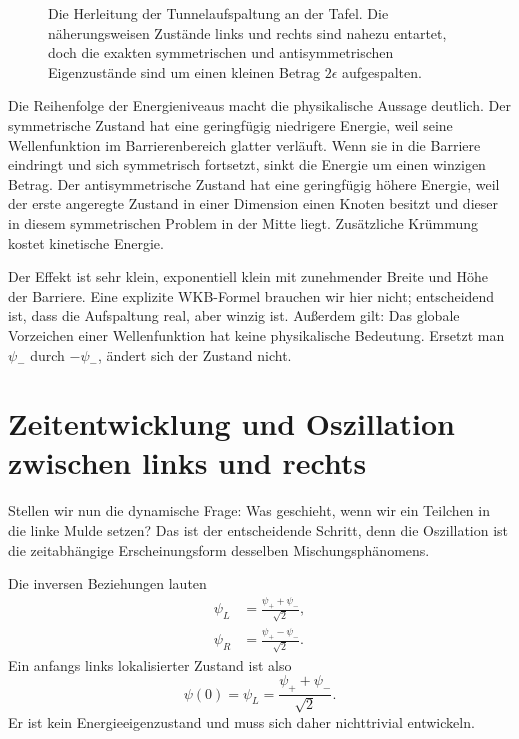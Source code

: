 \begin{figure}
\centering
{}
\caption{Die Herleitung der Tunnelaufspaltung an der Tafel. Die näherungsweisen Zustände links und rechts sind nahezu entartet, doch die exakten symmetrischen und antisymmetrischen Eigenzustände sind um einen kleinen Betrag \(2\epsilon\) aufgespalten.}
\end{figure}

Die Reihenfolge der Energieniveaus macht die physikalische Aussage deutlich. Der symmetrische Zustand hat eine geringfügig niedrigere Energie, weil seine Wellenfunktion im Barrierenbereich glatter verläuft. Wenn sie in die Barriere eindringt und sich symmetrisch fortsetzt, sinkt die Energie um einen winzigen Betrag. Der antisymmetrische Zustand hat eine geringfügig höhere Energie, weil der erste angeregte Zustand in einer Dimension einen Knoten besitzt und dieser in diesem symmetrischen Problem in der Mitte liegt. Zusätzliche Krümmung kostet kinetische Energie.

Der Effekt ist sehr klein, exponentiell klein mit zunehmender Breite und Höhe der Barriere. Eine explizite WKB-Formel brauchen wir hier nicht; entscheidend ist, dass die Aufspaltung real, aber winzig ist. Außerdem gilt: Das globale Vorzeichen einer Wellenfunktion hat keine physikalische Bedeutung. Ersetzt man \(\psi_-\) durch \(-\psi_-\), ändert sich der Zustand nicht.

\section{Zeitentwicklung und Oszillation zwischen links und rechts}

Stellen wir nun die dynamische Frage: Was geschieht, wenn wir ein Teilchen in die linke Mulde setzen? Das ist der entscheidende Schritt, denn die Oszillation ist die zeitabhängige Erscheinungsform desselben Mischungsphänomens.

Die inversen Beziehungen lauten
\begin{align}
\psi_L &= \frac{\psi_+ + \psi_-}{\sqrt{2}},\\
\psi_R &= \frac{\psi_+ - \psi_-}{\sqrt{2}}.
\end{align}
Ein anfangs links lokalisierter Zustand ist also
\begin{equation}
\psi(0)=\psi_L=\frac{\psi_+ + \psi_-}{\sqrt{2}}.
\end{equation}
Er ist kein Energieeigenzustand und muss sich daher nichttrivial entwickeln.

